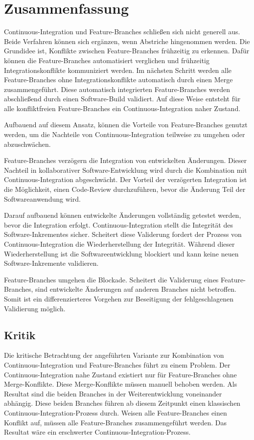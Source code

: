 \chapter{Zusammenfassung}

Continuous-Integration und Feature-Branches schließen sich nicht generell aus. Beide Verfahren können sich ergänzen, wenn Abstriche hingenommen werden. Die Grundidee ist, Konflikte zwischen Feature-Branches frühzeitig zu erkennen. Dafür können die Feature-Branches automatisiert verglichen und frühzeitig Integrationskonflikte kommuniziert werden. Im nächsten Schritt werden alle Feature-Branches ohne Integrationskonflikte automatisch durch einen Merge zusammengeführt. Diese automatisch integrierten Feature-Branches werden abschließend durch einen Software-Build validiert. Auf diese Weise entsteht für alle konfliktfreien Feature-Branches ein Continuous-Integration naher Zustand.

Aufbauend auf diesem Ansatz, können die Vorteile von Feature-Branches genutzt werden, um die Nachteile von Continuous-Integration teilweise zu umgehen oder abzuschwächen.

Feature-Branches verzögern die Integration von entwickelten Änderungen. Dieser \\Nachteil in kollaborativer Software-Entwicklung wird durch die Kombination mit Continuous\hyp{}Integration abgeschwächt. Der Vorteil der verzögerten Integration ist die Möglichkeit, einen Code-Review durchzuführen, bevor die Änderung Teil der Softwareanwendung wird. 

Darauf aufbauend können entwickelte Änderungen vollständig getestet werden, bevor die Integration erfolgt. Continuous-Integration stellt die Integrität des Software\hyp{}Inkrementes sicher. Scheitert diese Validerung fordert der Prozess von Continuous-Integration die Wiederherstellung der Integrität. Während dieser Wiederherstellung ist die Softwareentwicklung blockiert und kann keine neuen Software-Inkremente validieren. 

Feature-Branches umgehen die Blockade. Scheitert die Validerung eines Feature\hyp{}Branches, sind entwickelte Änderungen auf anderen Branches nicht betroffen. Somit ist ein differenzierteres Vorgehen zur Beseitigung der fehlgeschlagenen Validierung möglich.

\section{Kritik}

Die kritische Betrachtung der angeführten Variante zur Kombination von Continuous\hyp{}Integration und Feature-Branches führt zu einem Problem. Der Continuous-Integration nahe Zustand existiert nur für Feature-Branches ohne Merge-Konflikte. Diese Merge-Konflikte müssen manuell behoben werden. Als Resultat sind die beiden Branches in der Weiterentwicklung voneinander abhängig. Diese beiden Branches führen ab diesem Zeitpunkt einen \glqq klassischen\grqq{} Continuous-Integration-Prozess durch. Weisen alle Feature-Branches einen Konflikt auf, müssen alle Feature-Branches zusammengeführt werden. Das Resultat wäre ein \glqq erschwerter\grqq{} Continuous-Integration-Prozess.

